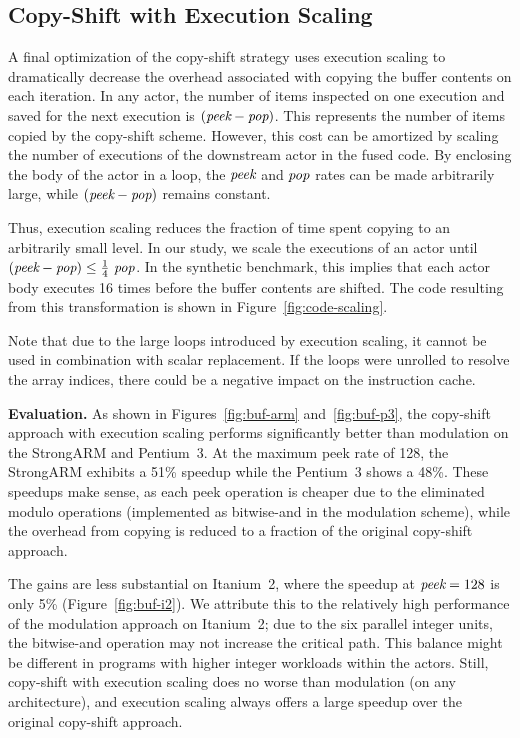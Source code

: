 \documentclass{sigplanconf}
\begin{document}
\subsection{Copy-Shift with Execution Scaling}

A final optimization of the copy-shift strategy uses execution scaling
to dramatically decrease the overhead associated with copying the
buffer contents on each iteration.  In any actor, the number of items
inspected on one execution and saved for the next
execution is $(\mbox{\it peek} - \mbox{\it pop})$.  This represents
the number of items copied by the copy-shift scheme.  However, this
cost can be amortized by scaling the number of executions of the
downstream actor in the fused code.  By enclosing the body of the
actor in a loop, the $\mbox{\it peek}$ and $\mbox{\it pop}$ rates can
be made arbitrarily large, while $(\mbox{\it peek} - \mbox{\it pop})$
remains constant.

Thus, execution scaling reduces the fraction of time spent copying to
an arbitrarily small level.  In our study, we scale the executions of
an actor until $(\mbox{\it peek} - \mbox{\it pop}) \leq
\frac{1}{4}~\mbox{\it pop}$.  In the synthetic benchmark, this implies
that each actor body executes 16 times before the buffer contents are
shifted.  The code resulting from this transformation is shown in
Figure~\ref{fig:code-scaling}.

Note that due to the large loops introduced by execution scaling, it
cannot be used in combination with scalar replacement.  If the loops
were unrolled to resolve the array indices, there could be a negative
impact on the instruction cache.

{\bf Evaluation.}  As shown in Figures~\ref{fig:buf-arm}
and~\ref{fig:buf-p3}, the copy-shift approach with execution scaling
performs significantly better than modulation on the StrongARM and
Pentium~3.  At the maximum peek rate of 128, the StrongARM exhibits a
51\% speedup while the Pentium~3 shows a 48\%.  These speedups make
sense, as each peek operation is cheaper due to the eliminated modulo
operations (implemented as bitwise-and in the modulation scheme),
while the overhead from copying is reduced to a fraction of the
original copy-shift approach.

The gains are less substantial on Itanium~2, where the speedup at
$\mbox{\it peek} = 128$ is only 5\% (Figure~\ref{fig:buf-i2}).  We
attribute this to the relatively high performance of the modulation
approach on Itanium~2; due to the six parallel integer units, the
bitwise-and operation may not increase the critical path.  This
balance might be different in programs with higher integer workloads
within the actors.  Still, copy-shift with execution scaling does no
worse than modulation (on any architecture), and execution scaling
always offers a large speedup over the original copy-shift approach.
\end{document}
